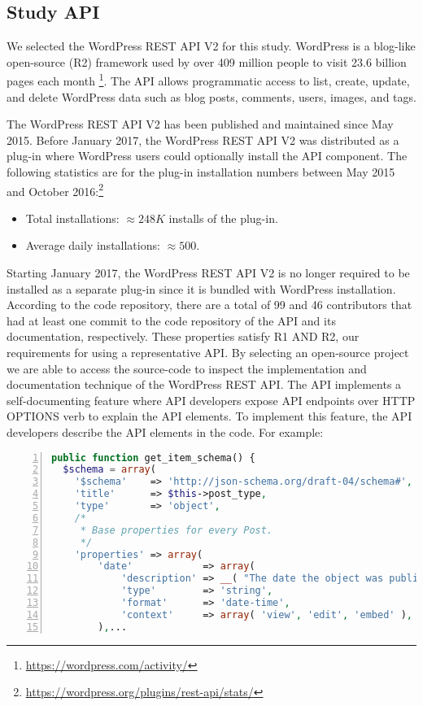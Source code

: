 \subsection{Study API} %

We selected the WordPress REST API V2 for this study. WordPress is a blog-like open-source (R2) framework used by over 409 million people to visit 23.6 billion pages each month \footnote{\url{https://wordpress.com/activity/}}. The API allows programmatic access to list, create, update, and delete WordPress data such as blog posts, comments, users, images, and tags.

The WordPress REST API V2 has been published and maintained since May 2015. Before January 2017, the WordPress REST API V2 was distributed as a plug-in where WordPress users could optionally install the API component. The following statistics are for the plug-in installation numbers between May 2015 and October 2016:\footnote{\url{https://wordpress.org/plugins/rest-api/stats/}}

\begin{itemize}
  \item Total installations: $ \approx 248K$ installs of the plug-in.
  \item Average daily installations: $ \approx 500$.
\end{itemize}

Starting January 2017, the WordPress REST API V2 is no longer required to be installed as a separate plug-in since it is bundled with WordPress installation. According to the code repository, there are a total of 99 and 46 contributors that had at least one commit to the code repository of the API and its documentation, respectively. These properties satisfy R1 AND R2, our requirements for using a representative API. By selecting an open-source project we are able to access the source-code to inspect the implementation and documentation technique of the WordPress REST API. The API implements a self-documenting feature where API developers expose API endpoints over HTTP OPTIONS verb to explain the API elements. To implement this feature, the API developers describe the API elements in the code. For example:

\lstset{basicstyle=\ttfamily\footnotesize,breaklines=true}
\begin{lstlisting}[language=php,showspaces=false,showstringspaces=false,numbers=left,xleftmargin=2em,caption={Example of self-documenting API Code in PHP},label=wordpress_code]
public function get_item_schema() {
  $schema = array(
    '$schema'    => 'http://json-schema.org/draft-04/schema#',
    'title'      => $this->post_type,
    'type'       => 'object',
    /*
     * Base properties for every Post.
     */
    'properties' => array(
        'date'            => array(
            'description' => __( "The date the object was published, in the site's timezone." ),
            'type'        => 'string',
            'format'      => 'date-time',
            'context'     => array( 'view', 'edit', 'embed' ),
        ),...
\end{lstlisting}

